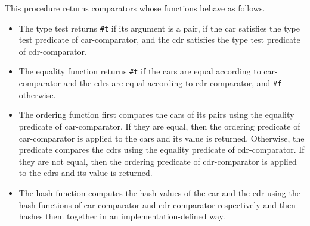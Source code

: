 \begin{entry}{%
  }

  This procedure returns comparators whose functions behave as
  follows. 

  \begin{itemize}
  \item The type test returns \texttt{\#t} if its argument is a pair,
    if the car satisfies the type test predicate of car-comparator,
    and the cdr satisfies the type test predicate of cdr-comparator.
  \item The equality function returns \texttt{\#t} if the cars are
    equal according to car-comparator and the cdrs are equal according
    to cdr-comparator, and \texttt{\#f} otherwise.
  \item The ordering function first compares the cars of its pairs
    using the equality predicate of car-comparator. If they are equal,
    then the ordering predicate of car-comparator is applied to the
    cars and its value is returned. Otherwise, the predicate compares
    the cdrs using the equality predicate of cdr-comparator. If they
    are not equal, then the ordering predicate of cdr-comparator is
    applied to the cdrs and its value is returned.
  \item The hash function computes the hash values of the car and the
    cdr using the hash functions of car-comparator and cdr-comparator
    respectively and then hashes them together in an
    implementation-defined way.
  \end{itemize}
\end{entry}

